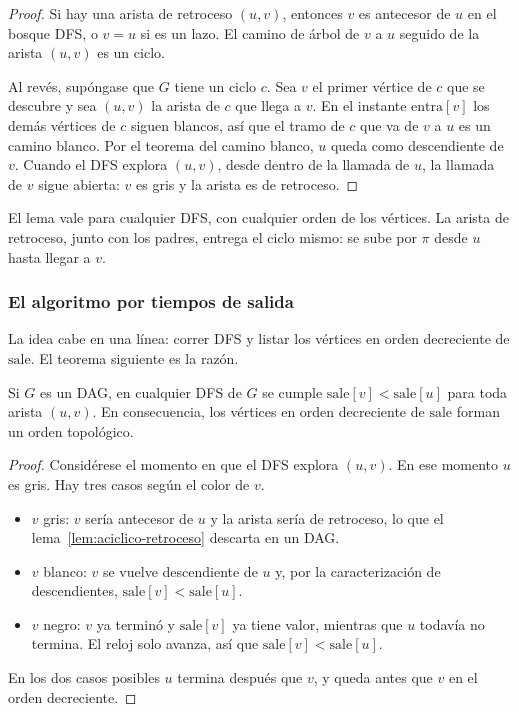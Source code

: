 \documentclass[11pt,letterpaper]{article}
\begin{document}
\begin{proof}
  Si hay una arista de retroceso $(u, v)$, entonces $v$ es antecesor de
  $u$ en el bosque DFS, o $v = u$ si es un lazo. El camino de árbol de
  $v$ a $u$ seguido de la arista $(u, v)$ es un ciclo.

  Al revés, supóngase que $G$ tiene un ciclo $c$. Sea $v$ el primer
  vértice de $c$ que se descubre y sea $(u, v)$ la arista de $c$ que
  llega a $v$. En el instante $\text{entra}[v]$ los demás vértices de
  $c$ siguen blancos, así que el tramo de $c$ que va de $v$ a $u$ es un
  camino blanco. Por el teorema del camino blanco, $u$ queda como
  descendiente de $v$. Cuando el DFS explora $(u, v)$, desde dentro de
  la llamada de $u$, la llamada de $v$ sigue abierta: $v$ es gris y la
  arista es de retroceso.
\end{proof}

El lema vale para cualquier DFS, con cualquier orden de los vértices.
La arista de retroceso, junto con los padres, entrega el ciclo mismo:
se sube por $\pi$ desde $u$ hasta llegar a $v$.

\subsubsection*{El algoritmo por tiempos de salida}

La idea cabe en una línea: correr DFS y listar los vértices en orden
decreciente de $\text{sale}$. El teorema siguiente es la razón.

\begin{teorema}
  \label{teo:topologico-salida}
  Si $G$ es un DAG, en cualquier DFS de $G$ se cumple
  $\text{sale}[v] < \text{sale}[u]$ para toda arista $(u, v)$. En
  consecuencia, los vértices en orden decreciente de $\text{sale}$
  forman un orden topológico.
\end{teorema}

\begin{proof}
  Considérese el momento en que el DFS explora $(u, v)$. En ese momento
  $u$ es gris. Hay tres casos según el color de $v$.
  \begin{itemize}[itemsep=0.1em]
    \item $v$ gris: $v$ sería antecesor de $u$ y la arista sería de
          retroceso, lo que el lema~\ref{lem:aciclico-retroceso}
          descarta en un DAG.
    \item $v$ blanco: $v$ se vuelve descendiente de $u$ y, por la
          caracterización de descendientes,
          $\text{sale}[v] < \text{sale}[u]$.
    \item $v$ negro: $v$ ya terminó y $\text{sale}[v]$ ya tiene valor,
          mientras que $u$ todavía no termina. El reloj solo avanza,
          así que $\text{sale}[v] < \text{sale}[u]$.
  \end{itemize}
  En los dos casos posibles $u$ termina después que $v$, y queda antes
  que $v$ en el orden decreciente.
\end{proof}
\end{document}
